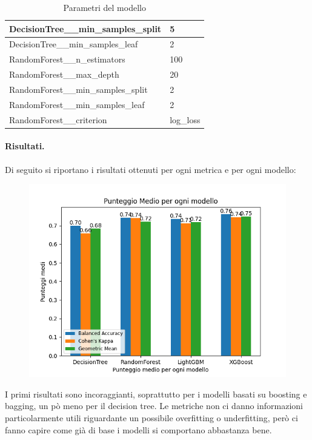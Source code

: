 \begin{table}[H]
\begin{tabular}{|l|l|}
            DecisionTree\_\_min\_samples\_split & 5               \\ \hline
            DecisionTree\_\_min\_samples\_leaf & 2               \\ \hline
            RandomForest\_\_n\_estimators     & 100             \\ \hline
            RandomForest\_\_max\_depth        & 20              \\ \hline
            RandomForest\_\_min\_samples\_split & 2               \\ \hline
            RandomForest\_\_min\_samples\_leaf & 2               \\ \hline
            RandomForest\_\_criterion         & log\_loss       \\ \hline
            \end{tabular}
            \caption{Parametri del modello}
            
            \end{table}
\paragraph{Risultati.} Di seguito si riportano i risultati ottenuti per ogni metrica e per ogni modello:
\begin{figure}[H]
    \centering
    \includegraphics[scale=0.5]{img/normal_metrics.png}
\end{figure}
\noindent I primi risultati sono incoraggianti, soprattutto per i modelli basati su boosting e bagging, un pò meno per il decision tree. Le metriche non ci danno informazioni particolarmente utili riguardante un possibile overfitting o underfitting, però ci fanno capire come già di base i modelli si comportano abbastanza bene.

